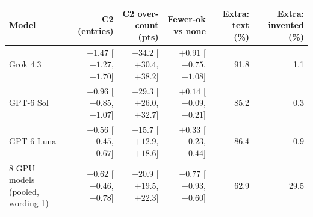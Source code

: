 \begin{tabular}{lrrrrr}
  \toprule
  Model & C2 (entries) & C2 over-count (pts) & Fewer-ok vs none & Extra: text (\%) & Extra: invented (\%) \\
  \midrule
  Grok 4.3 & $+1.47$ [$+1.27$, $+1.70$] & $+34.2$ [$+30.4$, $+38.2$] & $+0.91$ [$+0.75$, $+1.08$] & 91.8 & 1.1 \\
  GPT-6 Sol & $+0.96$ [$+0.85$, $+1.07$] & $+29.3$ [$+26.0$, $+32.7$] & $+0.14$ [$+0.09$, $+0.21$] & 85.2 & 0.3 \\
  GPT-6 Luna & $+0.56$ [$+0.45$, $+0.67$] & $+15.7$ [$+12.9$, $+18.6$] & $+0.33$ [$+0.23$, $+0.44$] & 86.4 & 0.9 \\
  8 GPU models (pooled, wording 1) & $+0.62$ [$+0.46$, $+0.78$] & $+20.9$ [$+19.5$, $+22.3$] & $-0.77$ [$-0.93$, $-0.60$] & 62.9 & 29.5 \\
  \bottomrule
\end{tabular}

